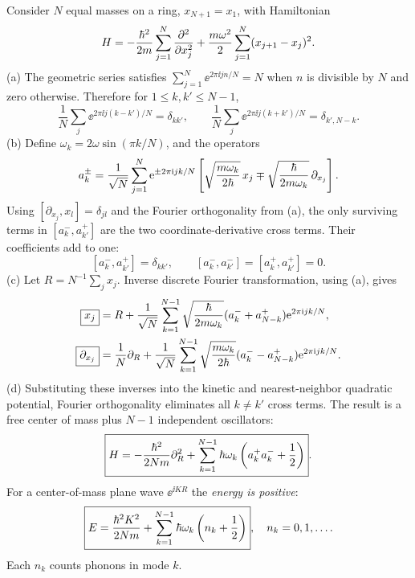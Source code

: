 Consider $N$ equal masses on a ring,
$x_{N+1}=x_1$, with Hamiltonian
\begin{equation}
H=-\frac{\hbar^2}{2m}\sum_{j=1}^N
\frac{\partial^2}{\partial x_j^2}
+\frac{m\omega^2}{2}
\sum_{j=1}^N(x_{j+1}-x_j)^2.
\end{equation}
(a) The geometric series satisfies
$\sum_{j=1}^N\ee^{2\pi\ii j n/N}=N$
when $n$ is divisible by $N$ and
zero otherwise. Therefore for
$1\le k,k'\le N-1$,
\begin{equation}
\frac1N\sum_j\ee^{2\pi\ii j(k-k')/N}
=\delta_{kk'},\qquad
\frac1N\sum_j\ee^{2\pi\ii j(k+k')/N}
=\delta_{k',N-k}.
\end{equation}
(b) Define $\omega_k=2\omega\sin(\pi k/N)$,
and the operators
\begin{equation}
a_k^\pm=\frac1{\sqrt N}\sum_{j=1}^N
\mathrm e^{\pm2\pi\mathrm i jk/N}
\left[
\sqrt{\frac{m\omega_k}{2\hbar}}\,x_j
\mp\sqrt{\frac{\hbar}{2m\omega_k}}\,
\partial_{x_j}\right].
\end{equation}
Using $[\partial_{x_j},x_l]=\delta_{jl}$
and the Fourier orthogonality from (a),
the only surviving terms in
$[a_k^-,a_{k'}^+]$ are the two
coordinate-derivative cross terms.
Their coefficients add to one:
\begin{equation}
\boxed{[a_k^-,a_{k'}^+]=\delta_{kk'},\qquad
[a_k^-,a_{k'}^-]=[a_k^+,a_{k'}^+]=0}.
\end{equation}
(c) Let $R=N^{-1}\sum_jx_j$.
Inverse discrete Fourier transformation,
using (a), gives
\begin{align}
\boxed{x_j}&=R+\frac1{\sqrt N}\sum_{k=1}^{N-1}
\sqrt{\frac{\hbar}{2m\omega_k}}
(a_k^-+a_{N-k}^+)\mathrm e^{2\pi\mathrm i jk/N},\\
\boxed{\partial_{x_j}}&=
\frac1N\partial_R+
\frac1{\sqrt N}\sum_{k=1}^{N-1}
\sqrt{\frac{m\omega_k}{2\hbar}}
(a_k^--a_{N-k}^+)\mathrm e^{2\pi\mathrm i jk/N}.
\end{align}
(d) Substituting these inverses into
the kinetic and nearest-neighbor
quadratic potential, Fourier orthogonality
eliminates all $k\ne k'$ cross terms.
The result is a free center of mass
plus $N-1$ independent oscillators:
\begin{equation}
\boxed{H=-\frac{\hbar^2}{2Nm}\partial_R^2+
\sum_{k=1}^{N-1}\hbar\omega_k
\left(a_k^+a_k^-+\frac12\right)}.
\end{equation}
For a center-of-mass plane wave
$\ee^{\ii K R}$ the \emph{energy is positive}:
\begin{equation}
\boxed{E=\frac{\hbar^2K^2}{2Nm}+
\sum_{k=1}^{N-1}\hbar\omega_k
\left(n_k+\frac12\right)},\quad
n_k=0,1,\dots.
\end{equation}
Each $n_k$ counts phonons in mode $k$.

